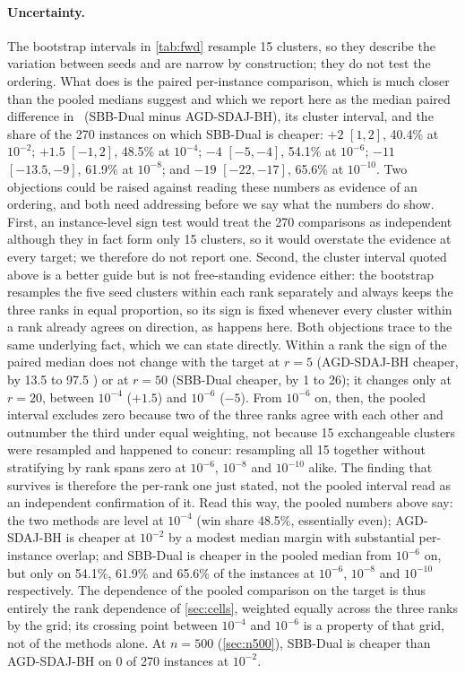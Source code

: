 \paragraph{Uncertainty.}
The bootstrap intervals in \cref{tab:fwd} resample 15 clusters, so they
describe the variation between seeds and are narrow by construction; they do
not test the ordering. What does is the paired per-instance comparison,
which is much closer than the pooled medians suggest and which we report
here as the median paired difference in \EVDs\ (SBB-Dual minus
AGD-SDAJ-BH), its cluster interval, and the share of the 270 instances on
which SBB-Dual is cheaper:
$+2$ $[1,2]$, 40.4\% at $10^{-2}$;
$+1.5$ $[-1,2]$, 48.5\% at $10^{-4}$;
$-4$ $[-5,-4]$, 54.1\% at $10^{-6}$;
$-11$ $[-13.5,-9]$, 61.9\% at $10^{-8}$; and
$-19$ $[-22,-17]$, 65.6\% at $10^{-10}$.
Two objections could be raised against reading these numbers as evidence of
an ordering, and both need addressing before we say what the numbers do
show. First, an instance-level sign test would treat the 270 comparisons as
independent although they in fact form only 15 clusters, so it would
overstate the evidence at every target; we therefore do not report one.
Second, the cluster interval quoted above is a better guide but is not
free-standing evidence either: the bootstrap resamples the five seed
clusters within each rank separately and always keeps the three ranks in
equal proportion, so its sign is fixed whenever every cluster within a rank
already agrees on direction, as happens here. Both objections trace to the
same underlying fact, which we can state directly. Within a rank the sign
of the paired median does not change with the target at $r=5$ (AGD-SDAJ-BH
cheaper, by 13.5 to 97.5 \EVDs) or at $r=50$ (SBB-Dual cheaper, by 1 to 26);
it changes only at $r=20$, between $10^{-4}$ ($+1.5$) and $10^{-6}$ ($-5$).
From $10^{-6}$ on, then, the pooled interval excludes zero because two of
the three ranks agree with each other and outnumber the third under equal
weighting, not because 15 exchangeable clusters were resampled and happened
to concur: resampling all 15 together without stratifying by rank spans
zero at $10^{-6}$, $10^{-8}$ and $10^{-10}$ alike. The finding that survives
is therefore the per-rank one just stated, not the pooled interval read as
an independent confirmation of it. Read this way, the pooled numbers above
say: the two methods are level at $10^{-4}$ (win share 48.5\%, essentially
even); AGD-SDAJ-BH is cheaper at $10^{-2}$ by a modest median margin with
substantial per-instance overlap; and SBB-Dual is cheaper in the pooled
median from $10^{-6}$ on, but only on 54.1\%, 61.9\% and 65.6\% of the
instances at $10^{-6}$, $10^{-8}$ and $10^{-10}$ respectively. The
dependence of the pooled comparison on the target is thus entirely the rank
dependence of \cref{sec:cells}, weighted equally across the three ranks by
the grid; its crossing point between $10^{-4}$ and $10^{-6}$ is a property
of that grid, not of the methods alone. At $n=500$ (\cref{sec:n500}),
SBB-Dual is cheaper than AGD-SDAJ-BH on 0 of 270 instances at $10^{-2}$.

